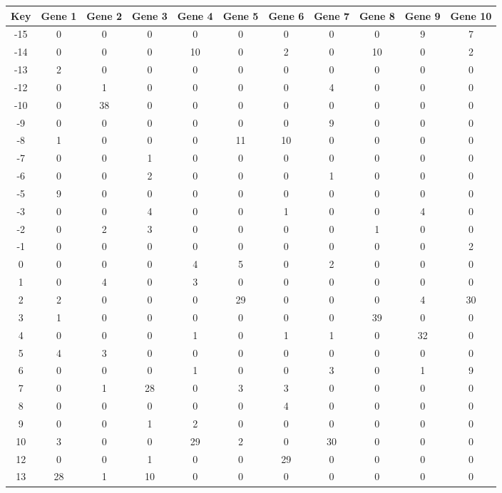 \begin{tabular}{|c|c|c|c|c|c|c|c|c|c|c|}
\hline
Key & Gene 1 & Gene 2 & Gene 3 & Gene 4 & Gene 5 & Gene 6 & Gene 7 & Gene 8 & Gene 9 & Gene 10 \\
\hline
-15 & 0 & 0 & 0 & 0 & 0 & 0 & 0 & 0 & 9 & 7 \\
-14 & 0 & 0 & 0 & 10 & 0 & 2 & 0 & 10 & 0 & 2 \\
-13 & 2 & 0 & 0 & 0 & 0 & 0 & 0 & 0 & 0 & 0 \\
-12 & 0 & 1 & 0 & 0 & 0 & 0 & 4 & 0 & 0 & 0 \\
-10 & 0 & 38 & 0 & 0 & 0 & 0 & 0 & 0 & 0 & 0 \\
-9 & 0 & 0 & 0 & 0 & 0 & 0 & 9 & 0 & 0 & 0 \\
-8 & 1 & 0 & 0 & 0 & 11 & 10 & 0 & 0 & 0 & 0 \\
-7 & 0 & 0 & 1 & 0 & 0 & 0 & 0 & 0 & 0 & 0 \\
-6 & 0 & 0 & 2 & 0 & 0 & 0 & 1 & 0 & 0 & 0 \\
-5 & 9 & 0 & 0 & 0 & 0 & 0 & 0 & 0 & 0 & 0 \\
-3 & 0 & 0 & 4 & 0 & 0 & 1 & 0 & 0 & 4 & 0 \\
-2 & 0 & 2 & 3 & 0 & 0 & 0 & 0 & 1 & 0 & 0 \\
-1 & 0 & 0 & 0 & 0 & 0 & 0 & 0 & 0 & 0 & 2 \\
0 & 0 & 0 & 0 & 4 & 5 & 0 & 2 & 0 & 0 & 0 \\
1 & 0 & 4 & 0 & 3 & 0 & 0 & 0 & 0 & 0 & 0 \\
2 & 2 & 0 & 0 & 0 & 29 & 0 & 0 & 0 & 4 & 30 \\
3 & 1 & 0 & 0 & 0 & 0 & 0 & 0 & 39 & 0 & 0 \\
4 & 0 & 0 & 0 & 1 & 0 & 1 & 1 & 0 & 32 & 0 \\
5 & 4 & 3 & 0 & 0 & 0 & 0 & 0 & 0 & 0 & 0 \\
6 & 0 & 0 & 0 & 1 & 0 & 0 & 3 & 0 & 1 & 9 \\
7 & 0 & 1 & 28 & 0 & 3 & 3 & 0 & 0 & 0 & 0 \\
8 & 0 & 0 & 0 & 0 & 0 & 4 & 0 & 0 & 0 & 0 \\
9 & 0 & 0 & 1 & 2 & 0 & 0 & 0 & 0 & 0 & 0 \\
10 & 3 & 0 & 0 & 29 & 2 & 0 & 30 & 0 & 0 & 0 \\
12 & 0 & 0 & 1 & 0 & 0 & 29 & 0 & 0 & 0 & 0 \\
13 & 28 & 1 & 10 & 0 & 0 & 0 & 0 & 0 & 0 & 0 \\
\hline
\end{tabular}